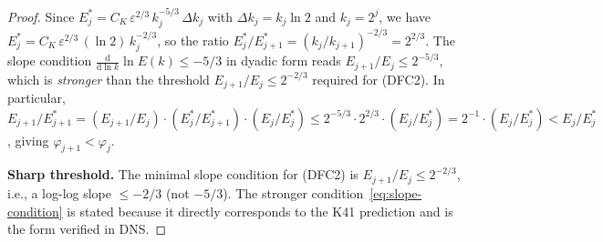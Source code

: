 \documentclass[12pt,a4paper]{article}
\theoremstyle{breakdef}
\theoremstyle{breakplain}
\theoremstyle{breakdef}
\begin{document}
\begin{proof}
Since $E_j^* = C_K\,\varepsilon^{2/3}\,k_j^{-5/3}\,\Delta k_j$ with
$\Delta k_j = k_j \ln 2$ and $k_j = 2^j$, we have
$E_j^* = C_K\,\varepsilon^{2/3}\,(\ln 2)\,k_j^{-2/3}$, so the ratio
$E_j^*/E_{j+1}^* = (k_j/k_{j+1})^{-2/3} = 2^{2/3}$. The slope
condition $\frac{\mathrm{d}}{\mathrm{d}\ln k}\ln E(k) \le -5/3$
in dyadic form reads $E_{j+1}/E_j \le 2^{-5/3}$, which is
\emph{stronger} than the threshold $E_{j+1}/E_j \le 2^{-2/3}$
required for (DFC2). In particular,
$E_{j+1}/E_{j+1}^* = (E_{j+1}/E_j)\cdot(E_j^*/E_{j+1}^*)\cdot(E_j/E_j^*)
\le 2^{-5/3}\cdot 2^{2/3}\cdot(E_j/E_j^*) = 2^{-1}\cdot(E_j/E_j^*)
< E_j/E_j^*$, giving $\varphi_{j+1} < \varphi_j$.

\smallskip\noindent
\textbf{Sharp threshold.}\quad
The minimal slope condition for (DFC2) is $E_{j+1}/E_j \le 2^{-2/3}$,
i.e., a log-log slope $\le -2/3$ (not $-5/3$). The stronger
condition~\eqref{eq:slope-condition} is stated because it directly
corresponds to the K41 prediction and is the form verified in DNS.
\end{proof}
\end{document}

